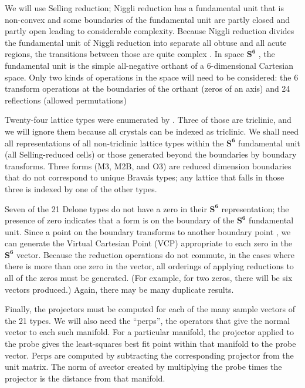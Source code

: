 \documentclass[preprint]{iucr}              %
\newcommand{\SVI}[0]{$\mathbf{S^{6}}$}
\begin{document}
	We will use Selling reduction; Niggli reduction has a fundamental 
	unit that is non-convex and some boundaries of the fundamental 
	unit are partly closed and partly open \cite{andrews2014} leading 
	to considerable complexity. Because Niggli reduction divides the 
	fundamental unit of Niggli reduction into separate all obtuse and all acute regions, 
	the transitions between those are quite complex \cite{andrews2014}. 
	In space \SVI{} \cite{andrews2019b}, the fundamental 
	unit is the simple all-negative orthant of a 6-dimensional 
	Cartesian space. Only two kinds of operations in the space 
	will need to be considered: the 6  transform operations 
	at the boundaries of the orthant (zeros of an axis) and 
	24 reflections (allowed permutations) \cite{andrews2019}
	
	Twenty-four lattice types were enumerated by . 
	Three of those are triclinic, and we will ignore them because all crystals 
	can be indexed as triclinic. We 
	shall need all representations of all non-triclinic lattice 
	types within the \SVI{} fundamental unit (all Selling-reduced 
	cells) or those generated beyond the boundaries by boundary transforms. 
	Three forms (M3, M2B, and O3) are reduced dimension boundaries that do
	not correspond to unique Bravais types; any lattice that falls in those
	three is indexed by one of the other types.
	
	
	
	
	Seven of the 21 Delone types do not have a zero in their \SVI{} 
	representation; the presence of zero indicates that a form is 
	on the boundary of the \SVI{} fundamental unit. Since a 
	point on the boundary transforms to another boundary 
	point \cite{andrews2019b}, we can generate the Virtual 
	Cartesian Point (VCP) \cite{andrews2019b} appropriate to 
	each zero in the \SVI{} vector. Because the reduction
	operations do not commute, in the cases where there is more 
	than one zero in the vector, all orderings of applying 
	reductions to all of the zeros must be generated. (For example, 
	for two zeros, there will be six vectors produced.) Again, 
	there may be many duplicate results. 
	
	Finally, the projectors must be computed for each of the many 
	sample vectors of the 21 types. We will also need the 
	``perps'', the operators that give the normal vector to each 
	such manifold. For a particular manifold, the projector 
	applied to the probe gives
	the least-squares best fit point within that manifold
	to the probe vector. 
	Perps are computed by subtracting the 
	corresponding projector from the unit matrix. The norm of avector
	created by multiplying the probe times the projector
	 is the distance from that manifold.
	
\end{document}

